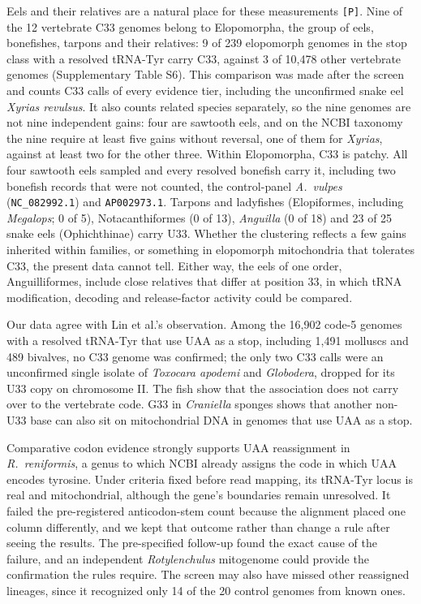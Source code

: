 \documentclass[11pt, a4paper]{article}
\begin{document}
Eels and their relatives are a natural place for these measurements \texttt{[P]}. Nine of the 12 vertebrate C33 genomes belong to Elopomorpha, the group of eels, bonefishes, tarpons and their relatives: 9 of 239 elopomorph genomes in the stop class with a resolved tRNA-Tyr carry C33, against 3 of 10,478 other vertebrate genomes (Supplementary Table S6). This comparison was made after the screen and counts C33 calls of every evidence tier, including the unconfirmed snake eel \textit{Xyrias revulsus}. It also counts related species separately, so the nine genomes are not nine independent gains: four are sawtooth eels, and on the NCBI taxonomy the nine require at least five gains without reversal, one of them for \textit{Xyrias}, against at least two for the other three. Within Elopomorpha, C33 is patchy. All four sawtooth eels sampled and every resolved bonefish carry it, including two bonefish records that were not counted, the control-panel \textit{A.\ vulpes} (\texttt{NC\_082992.1}) and \texttt{AP002973.1}. Tarpons and ladyfishes (Elopiformes, including \textit{Megalops}; 0 of 5), Notacanthiformes (0 of 13), \textit{Anguilla} (0 of 18) and 23 of 25 snake eels (Ophichthinae) carry U33. Whether the clustering reflects a few gains inherited within families, or something in elopomorph mitochondria that tolerates C33, the present data cannot tell. Either way, the eels of one order, Anguilliformes, include close relatives that differ at position 33, in which tRNA modification, decoding and release-factor activity could be compared.

Our data agree with Lin et al.'s observation. Among the 16,902 code-5 genomes with a resolved tRNA-Tyr that use UAA as a stop, including 1,491 molluscs and 489 bivalves, no C33 genome was confirmed; the only two C33 calls were an unconfirmed single isolate of \textit{Toxocara apodemi} and \textit{Globodera}, dropped for its U33 copy on chromosome II. The fish show that the association does not carry over to the vertebrate code. G33 in \textit{Craniella} sponges shows that another non-U33 base can also sit on mitochondrial DNA in genomes that use UAA as a stop.

Comparative codon evidence strongly supports UAA reassignment in \textit{R.\ reniformis}, a genus to which NCBI already assigns the code in which UAA encodes tyrosine. Under criteria fixed before read mapping, its tRNA-Tyr locus is real and mitochondrial, although the gene's boundaries remain unresolved. It failed the pre-registered anticodon-stem count because the alignment placed one column differently, and we kept that outcome rather than change a rule after seeing the results. The pre-specified follow-up found the exact cause of the failure, and an independent \textit{Rotylenchulus} mitogenome could provide the confirmation the rules require. The screen may also have missed other reassigned lineages, since it recognized only 14 of the 20 control genomes from known ones.
\end{document}
